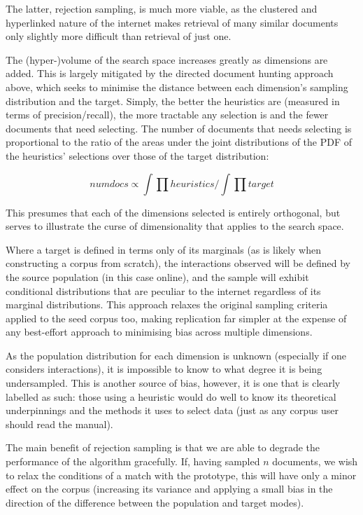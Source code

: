 The latter, rejection sampling, is much more viable, as the clustered and hyperlinked nature of the internet makes retrieval of many similar documents only slightly more difficult than retrieval of just one.

The (hyper-)volume of the search space increases greatly as dimensions are added.  This is largely mitigated by the directed document hunting approach above, which seeks to minimise the distance between each dimension's sampling distribution and the target.  Simply, the better the heuristics are (measured in terms of precision/recall), the more tractable any selection is and the fewer documents that need selecting.  The number of documents that needs selecting is proportional to the ratio of the areas under the joint distributions of the PDF of the heuristics' selections over those of the target distribution:

$$
numdocs \propto \int{\prod{heuristics}} / \int{\prod{target}}
$$

This presumes that each of the dimensions selected is entirely orthogonal, but serves to illustrate the curse of dimensionality that applies to the search space.

Where a target is defined in terms only of its marginals (as is likely when constructing a corpus from scratch), the interactions observed will be defined by the source population (in this case online), and the sample will exhibit conditional distributions that are peculiar to the internet regardless of its marginal distributions.  This approach relaxes the original sampling criteria applied to the seed corpus too, making replication far simpler at the expense of any best-effort approach to minimising bias across multiple dimensions.

As the population distribution for each dimension is unknown (especially if one considers interactions), it is impossible to know to what degree it is being undersampled.  This is another source of bias, however, it is one that is clearly labelled as such: those using a heuristic would do well to know its theoretical underpinnings and the methods it uses to select data (just as any corpus user should read the manual).

The main benefit of rejection sampling is that we are able to degrade the performance of the algorithm gracefully.  If, having sampled $n$ documents, we wish to relax the conditions of a match with the prototype, this will have only a minor effect on the corpus (increasing its variance and applying a small bias in the direction of the difference between the population and target modes).  

